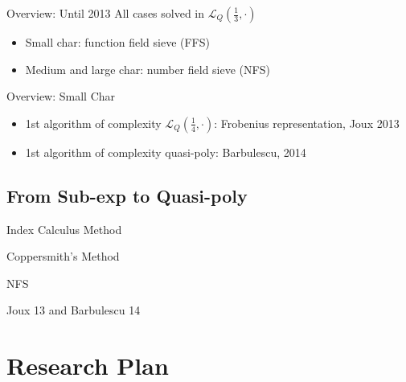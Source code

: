 \documentclass{beamer}
\begin{document}
		\begin{frame}{Overview: Until 2013}
			All cases solved in $\mathcal{L}_Q(\frac{1}{3}, \cdot)$
			\begin{itemize}
				\item
					Small char: function field sieve (FFS)
				\item	
					Medium and large char: number field sieve (NFS)
			\end{itemize}
		\end{frame}

		\begin{frame}{Overview: Small Char}
			\begin{itemize}
				\item
					1st algorithm of complexity $\mathcal{L}_Q(\frac{1}{4}, \cdot)$: Frobenius representation, Joux 2013
				\item
					1st algorithm of complexity quasi-poly: Barbulescu, 2014
			\end{itemize}
		\end{frame}

	\subsection{From Sub-exp to Quasi-poly}

		\begin{frame}{Index Calculus Method}
		\end{frame}

		\begin{frame}{Coppersmith's Method}
		\end{frame}
		
		\begin{frame}{NFS}
		\end{frame}
		
		\begin{frame}{Joux 13 and Barbulescu 14}
		\end{frame}

\section{Research Plan}
\end{document}
